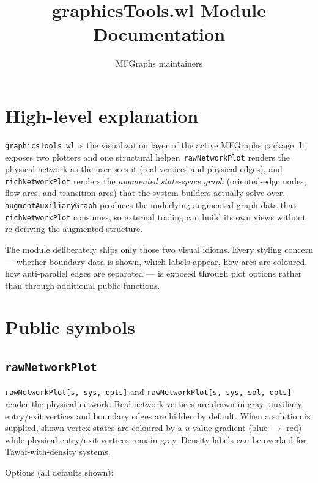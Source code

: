 \documentclass[11pt]{article}
\title{graphicsTools.wl Module Documentation}
\author{MFGraphs maintainers}
\date{}
\begin{document}
\maketitle

\section{High-level explanation}

\texttt{graphicsTools.wl} is the visualization layer of the active MFGraphs package. It exposes two plotters and one structural helper. \texttt{rawNetworkPlot} renders the physical network as the user sees it (real vertices and physical edges), and \texttt{richNetworkPlot} renders the \emph{augmented state-space graph} (oriented-edge nodes, flow arcs, and transition arcs) that the system builders actually solve over. \texttt{augmentAuxiliaryGraph} produces the underlying augmented-graph data that \texttt{richNetworkPlot} consumes, so external tooling can build its own views without re-deriving the augmented structure.

The module deliberately ships only those two visual idioms. Every styling concern --- whether boundary data is shown, which labels appear, how arcs are coloured, how anti-parallel edges are separated --- is exposed through plot options rather than through additional public functions.

\section{Public symbols}

\subsection*{\texttt{rawNetworkPlot}}

\texttt{rawNetworkPlot[s, sys, opts]} and \texttt{rawNetworkPlot[s, sys, sol, opts]} render the physical network. Real network vertices are drawn in gray; auxiliary entry/exit vertices and boundary edges are hidden by default. When a solution is supplied, shown vertex states are coloured by a $u$-value gradient (blue $\to$ red) while physical entry/exit vertices remain gray. Density labels can be overlaid for Tawaf-with-density systems.

Options (all defaults shown):
\end{document}
